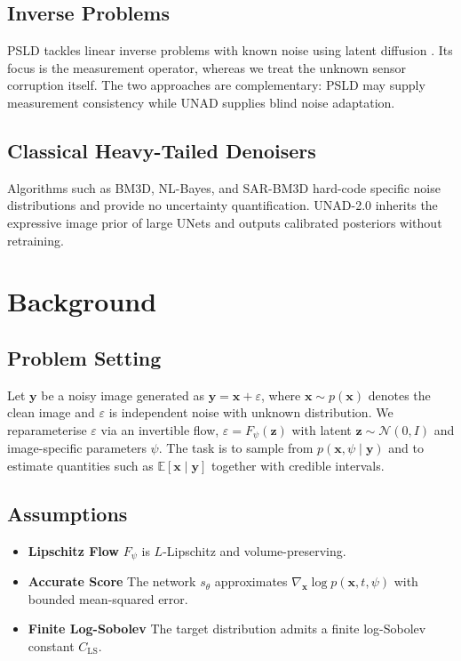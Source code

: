\documentclass{article} %
\begin{document}
\subsection{Inverse Problems}
PSLD tackles linear inverse problems with known noise using latent diffusion \cite{rout_2023_solving}. Its focus is the measurement operator, whereas we treat the unknown sensor corruption itself. The two approaches are complementary: PSLD may supply measurement consistency while UNAD supplies blind noise adaptation.

\subsection{Classical Heavy-Tailed Denoisers}
Algorithms such as BM3D, NL-Bayes, and SAR-BM3D hard-code specific noise distributions and provide no uncertainty quantification. UNAD-2.0 inherits the expressive image prior of large UNets and outputs calibrated posteriors without retraining.

\section{Background}
\label{sec:background}
\subsection{Problem Setting}
Let \(\mathbf{y}\) be a noisy image generated as \(\mathbf{y}=\mathbf{x}+\varepsilon\), where \(\mathbf{x}\sim p(\mathbf{x})\) denotes the clean image and \(\varepsilon\) is independent noise with unknown distribution. We reparameterise \(\varepsilon\) via an invertible flow, \(\varepsilon = F_{\psi}(\mathbf{z})\) with latent \(\mathbf{z}\sim \mathcal{N}(0,I)\) and image-specific parameters \(\psi\). The task is to sample from \(p(\mathbf{x},\psi\mid\mathbf{y})\) and to estimate quantities such as \(\mathbb{E}[\mathbf{x}\mid\mathbf{y}]\) together with credible intervals.

\subsection{Assumptions}
\begin{itemize}
  \item \textbf{Lipschitz Flow} \(F_{\psi}\) is \(L\)-Lipschitz and volume-preserving.
  \item \textbf{Accurate Score} The network \(s_{\theta}\) approximates \(\nabla_{\mathbf{x}} \log p(\mathbf{x},t,\psi)\) with bounded mean-squared error.
  \item \textbf{Finite Log-Sobolev} The target distribution admits a finite log-Sobolev constant \(C_{\mathrm{LS}}\).
\end{itemize}
\end{document}
